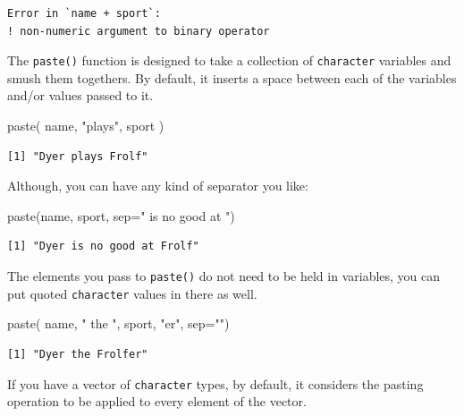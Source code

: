 \documentclass[
  letterpaper,
]{book}
\newenvironment{Shaded}{\begin{snugshade}}{\end{snugshade}}
\newcommand{\AttributeTok}[1]{\textcolor[rgb]{0.40,0.45,0.13}{#1}}
\newcommand{\FunctionTok}[1]{\textcolor[rgb]{0.28,0.35,0.67}{#1}}
\newcommand{\NormalTok}[1]{\textcolor[rgb]{0.00,0.23,0.31}{#1}}
\newcommand{\StringTok}[1]{\textcolor[rgb]{0.13,0.47,0.30}{#1}}
\begin{document}
\begin{verbatim}
Error in `name + sport`:
! non-numeric argument to binary operator
\end{verbatim}

The \texttt{paste()} function is designed to take a collection of
\texttt{character} variables and smush them togethers. By default, it
inserts a space between each of the variables and/or values passed to
it.

\begin{Shaded}
\begin{Highlighting}[]
\FunctionTok{paste}\NormalTok{( name, }\StringTok{"plays"}\NormalTok{, sport )}
\end{Highlighting}
\end{Shaded}

\begin{verbatim}
[1] "Dyer plays Frolf"
\end{verbatim}

Although, you can have any kind of separator you like:

\begin{Shaded}
\begin{Highlighting}[]
\FunctionTok{paste}\NormalTok{(name, sport, }\AttributeTok{sep=}\StringTok{" is no good at "}\NormalTok{)}
\end{Highlighting}
\end{Shaded}

\begin{verbatim}
[1] "Dyer is no good at Frolf"
\end{verbatim}

The elements you pass to \texttt{paste()} do not need to be held in
variables, you can put quoted \texttt{character} values in there as
well.

\begin{Shaded}
\begin{Highlighting}[]
\FunctionTok{paste}\NormalTok{( name, }\StringTok{" the "}\NormalTok{, sport, }\StringTok{"er"}\NormalTok{, }\AttributeTok{sep=}\StringTok{""}\NormalTok{) }
\end{Highlighting}
\end{Shaded}

\begin{verbatim}
[1] "Dyer the Frolfer"
\end{verbatim}

If you have a vector of \texttt{character} types, by default, it
considers the pasting operation to be applied to every element of the
vector.
\end{document}
